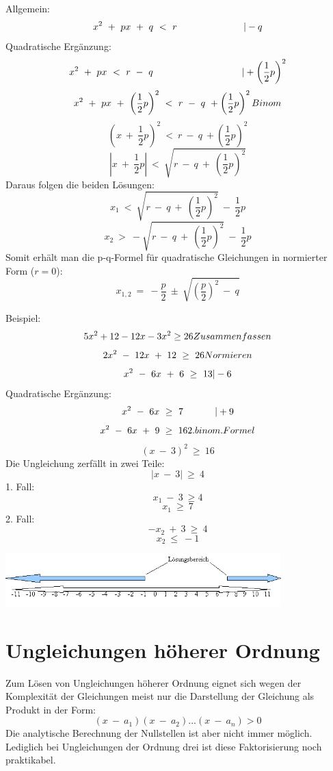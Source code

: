Allgemein:
\[x^2 \ + \ px \ + \ q \ < \ r \\ ~~~~~~~~~~~~~~~~~~~~~|-q \] 
Quadratische Ergänzung:
\[x^2 \ + \ px \ < \ r \ - \ q \\ ~~~~~~~~~~~~~~~~~~~~~~~~~~~~|+ \left(\frac 1 2 p \right)^2\]
\[x^2 \ + \ px \ + \ \left(\frac 1 2 p \right)^2 \ < \ r \ - \ q \ + \left(\frac 1 2 p \right)^2 \\ Binom \]
\[\left(x \ + \ \frac 1 2 p \right)^2 \ < \ r \ - \ q \ + \left(\frac 1 2 p \right)^2\]
\[|x \ + \ \frac 1 2 p| \ < \ \sqrt{ r \ - \ q \ + \ \left(\frac 1 2 p \right)^2}\]
Daraus folgen die beiden Lösungen:
\[x_1 \ < \ \sqrt{r  \ - \ q \ + \ \left(\frac 1 2 p \right)^2} \ - \ \frac 1 2 p\]
\[x_2 \ > \ -\sqrt{r \ - \ q \ + \ \left(\frac 1 2 p \right)^2} \ - \ \frac 1 2 p\]
Somit erhält man die p-q-Formel für quadratische Gleichungen in normierter Form ($ r = 0 $):
\[x_{1,2} \ = \ - \frac p 2 \ \pm \ \sqrt{ \left( \frac p 2 \right)^2 \ - \ q}\]

Beispiel:
\[5x^2 + 12 - 12x - 3x^2 \geq 26 \\ Zusammenfassen\]
\[2x^2 \ - \ 12x \ + \ 12 \ \geq \ 26 \\Normieren \]
\[x^2 \ - \ 6x \ + \ 6 \ \geq \ 13 \\ |-6 \]
Quadratische Ergänzung:
\[x^2 \ - \ 6x \ \geq \ 7 \\ ~~~~~~~~~~|+9\]
\[x^2 \ - \ 6x \ + \ 9 \ \geq \ 16 \\ 2. binom. Formel\]
\[(x \ - \ 3)^2 \ \geq \ 16\]
Die Ungleichung zerfällt in zwei Teile:
\[|x \ - \ 3| \ \geq \ 4 \]
1. Fall:
\[x_1 \ - \ 3 \ \geq 4\]
\[x_1 \ \geq \ 7\]
2. Fall: 
\[-x_2 \ + \ 3 \ \geq \ 4\]
\[x_2 \ \leq \ -1\]

\mdseries 	\normalsize
\begin{center}
\includegraphics[width=0.8\textwidth]{img/LBer2.png}
\end{center}

\section{Ungleichungen höherer Ordnung}

Zum Lösen von Ungleichungen höherer Ordnung eignet sich wegen der Komplexität der Gleichungen meist nur die Darstellung der Gleichung als Produkt in der Form: 
\[(x \ - \ a_1)(x \ - \ a_2)...(x \ - \ a_n) > 0 \]
Die analytische Berechnung der Nullstellen ist aber nicht immer möglich. Lediglich bei Ungleichungen der Ordnung drei ist diese Faktorisierung noch praktikabel.

